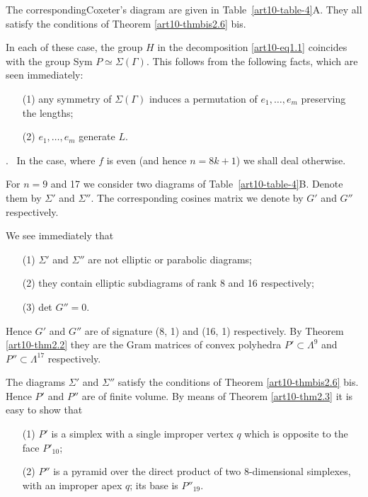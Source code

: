 The corresponding\pageoriginale Coxeter's diagram are given in Table~\ref{art10-table-4}A. They all satisfy the conditions of Theorem \ref{art10-thmbis2.6} bis.

In each of these case, the group $H$ in the decomposition \eqref{art10-eq1.1} coincides with the group Sym $P \simeq \Sigma (\Gamma)$. This follows from the following facts, which are seen immediately:
\begin{itemize}
\item[(1)] any symmetry of $\Sigma (\Gamma)$ induces a permutation of $e_1, \ldots, e_m$ preserving the lengths;

\item[(2)] $e_1, \ldots, e_m$ generate $L$.
\end{itemize}

.~ In the case, where $f$ is even (and hence $n = 8k +1$) we shall deal otherwise.

For $n=9$ and 17 we consider two diagrams of Table~\ref{art10-table-4}B. Denote them by $\Sigma'$ and $\Sigma''$. The corresponding cosines matrix we denote by $G'$ and $G''$ respectively.

We see immediately that 
\begin{itemize}
\item[(1)] $\Sigma'$ and $\Sigma''$ are not elliptic or parabolic diagrams;

\item[(2)] they contain elliptic subdiagrams of rank 8 and 16 respectively;

\item[(3)] det $G'' = 0$.
\end{itemize}

Hence $G'$ and $G''$ are of signature (8, 1) and (16, 1) respectively. By Theorem \ref{art10-thm2.2} they are the Gram matrices of convex polyhedra $P' \subset \Lambda^9$ and $P'' \subset \Lambda^{17}$ respectively.

The diagrams $\Sigma'$ and $\Sigma''$ satisfy the conditions of Theorem \ref{art10-thmbis2.6} bis. Hence $P'$ and $P''$ are of finite volume. By means of Theorem \ref{art10-thm2.3} it is easy to show that 
\begin{itemize}
\item[(1)] $P'$ is a simplex with a single improper vertex $q$ which is opposite to the face $P'_{10}$;

\item[(2)] $P''$ is a pyramid over the direct product of two 8-dimensional simplexes, with an improper apex $q$; its base is $P''_{19}$.
\end{itemize}

